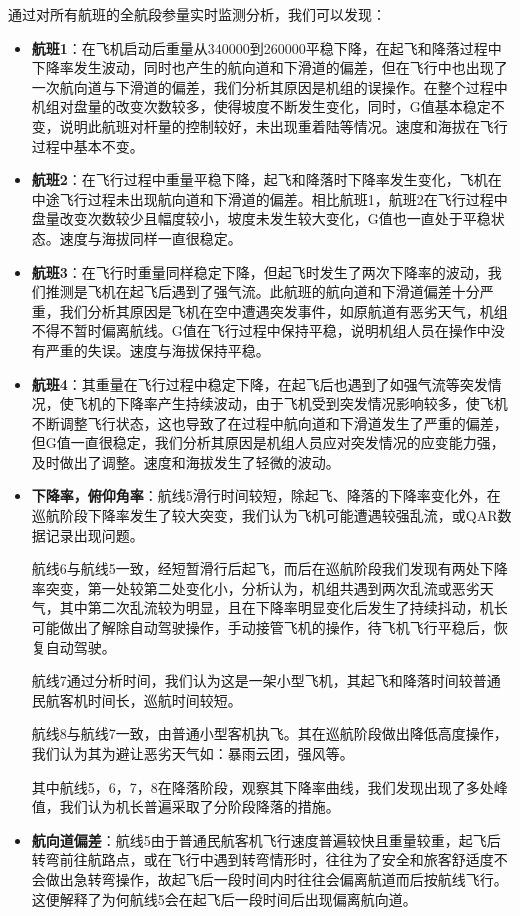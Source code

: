 \documentclass{MathorCupModeling}
\begin{document}
	通过对所有航班的全航段参量实时监测分析，我们可以发现：
	\begin{itemize}
		\item \textbf{航班1}：在飞机启动后重量从340000到260000平稳下降，在起飞和降落过程中下降率发生波动，同时也产生的航向道和下滑道的偏差，但在飞行中也出现了一次航向道与下滑道的偏差，我们分析其原因是机组的误操作。在整个过程中机组对盘量的改变次数较多，使得坡度不断发生变化，同时，G值基本稳定不变，说明此航班对杆量的控制较好，未出现重着陆等情况。速度和海拔在飞行过程中基本不变。
		\item \textbf{航班2}：在飞行过程中重量平稳下降，起飞和降落时下降率发生变化，飞机在中途飞行过程未出现航向道和下滑道的偏差。相比航班1，航班2在飞行过程中盘量改变次数较少且幅度较小，坡度未发生较大变化，G值也一直处于平稳状态。速度与海拔同样一直很稳定。
		\item \textbf{航班3}：在飞行时重量同样稳定下降，但起飞时发生了两次下降率的波动，我们推测是飞机在起飞后遇到了强气流。此航班的航向道和下滑道偏差十分严重，我们分析其原因是飞机在空中遭遇突发事件，如原航道有恶劣天气，机组不得不暂时偏离航线。G值在飞行过程中保持平稳，说明机组人员在操作中没有严重的失误。速度与海拔保持平稳。
		\item \textbf{航班4}：其重量在飞行过程中稳定下降，在起飞后也遇到了如强气流等突发情况，使飞机的下降率产生持续波动，由于飞机受到突发情况影响较多，使飞机不断调整飞行状态，这也导致了在过程中航向道和下滑道发生了严重的偏差，但G值一直很稳定，我们分析其原因是机组人员应对突发情况的应变能力强，及时做出了调整。速度和海拔发生了轻微的波动。
		\item \textbf{下降率，俯仰角率}：航线5滑行时间较短，除起飞、降落的下降率变化外，在巡航阶段下降率发生了较大突变，我们认为飞机可能遭遇较强乱流，或QAR数据记录出现问题。
		
		航线6与航线5一致，经短暂滑行后起飞，而后在巡航阶段我们发现有两处下降率突变，第一处较第二处变化小，分析认为，机组共遇到两次乱流或恶劣天气，其中第二次乱流较为明显，且在下降率明显变化后发生了持续抖动，机长可能做出了解除自动驾驶操作，手动接管飞机的操作，待飞机飞行平稳后，恢复自动驾驶。

		航线7通过分析时间，我们认为这是一架小型飞机，其起飞和降落时间较普通民航客机时间长，巡航时间较短。
		
		航线8与航线7一致，由普通小型客机执飞。其在巡航阶段做出降低高度操作，我们认为其为避让恶劣天气如：暴雨云团，强风等。
		
		其中航线5，6，7，8在降落阶段，观察其下降率曲线，我们发现出现了多处峰值，我们认为机长普遍采取了分阶段降落的措施。
		\item \textbf{航向道偏差}：航线5由于普通民航客机飞行速度普遍较快且重量较重，起飞后转弯前往航路点，或在飞行中遇到转弯情形时，往往为了安全和旅客舒适度不会做出急转弯操作，故起飞后一段时间内时往往会偏离航道而后按航线飞行。这便解释了为何航线5会在起飞后一段时间后出现偏离航向道。
		

\end{itemize}
\end{document}
